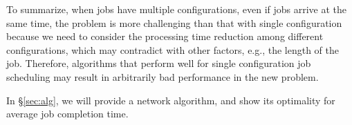 To summarize, when jobs have multiple configurations, even if jobs arrive at the same time, the problem is more challenging than that with single configuration because we need to consider the processing time reduction among different configurations, which may contradict with other factors, e.g., the length of the job. Therefore, algorithms that perform well for single configuration job scheduling may result in arbitrarily bad performance in the new problem.  



In \S\ref{sec:alg}, we will provide a network algorithm, and show its optimality for average job completion time.









